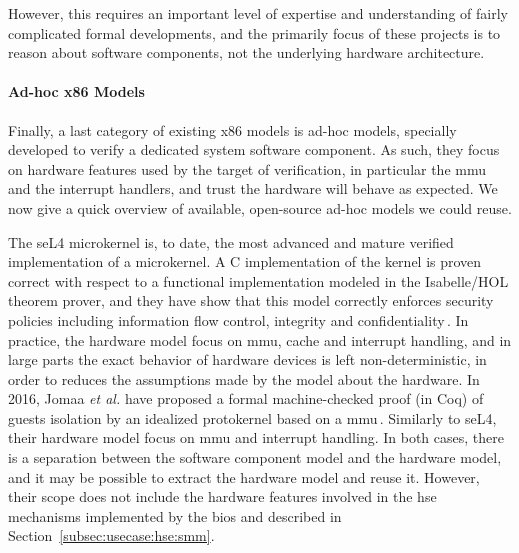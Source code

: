 However, this requires an important level of expertise and understanding of
fairly complicated formal developments, and the primarily focus of these
projects is to reason about software components, not the underlying hardware
architecture.

\paragraph{Ad-hoc x86 Models}
%
Finally, a last category of existing x86 models is ad-hoc models, specially
developed to verify a dedicated system software component.
%
As such, they focus on hardware features used by the target of verification, in
particular the \ac{mmu} and the interrupt handlers, and trust the hardware will
behave as expected.
%
We now give a quick overview of available, open-source ad-hoc models we could
reuse.

The seL4 microkernel is, to date, the most advanced and mature verified
implementation of a microkernel.
%
A C implementation of the kernel is proven correct with respect to a functional
implementation modeled in the Isabelle/HOL theorem prover, and they have show
that this model correctly enforces security policies including information flow
control, integrity and confidentiality\,\cite{klein2009sel4}.
%
In practice, the hardware model focus on \ac{mmu}, cache and interrupt handling,
and in large parts the exact behavior of hardware devices is left
non-deterministic, in order to reduces the assumptions made by the model about
the hardware.
%
In 2016, Jomaa \emph{et al.} have proposed a formal machine-checked proof (in
Coq) of guests isolation by an idealized protokernel based on a
\ac{mmu}\,\cite{jomaa2016mmu}.
%
Similarly to seL4, their hardware model focus on \ac{mmu} and interrupt
handling.
%
In both cases, there is a separation between the software component model and
the hardware model, and it may be possible to extract the hardware model and
reuse it.
%
However, their scope does not include the hardware features involved in the
\ac{hse} mechanisms implemented by the \ac{bios} and described in
Section~\ref{subsec:usecase:hse:smm}.

